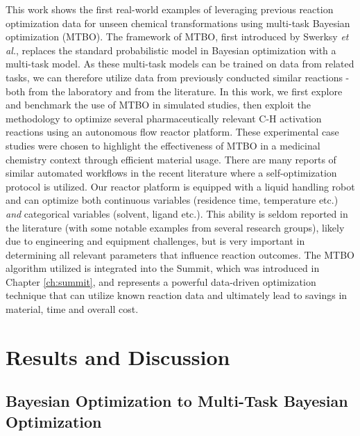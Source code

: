 This work shows the first real-world examples of leveraging previous reaction optimization data for unseen chemical transformations using multi-task Bayesian optimization (MTBO). The framework of MTBO, first introduced by Swerksy \textit{et al.},\cite{Swersky2013} replaces the standard probabilistic model in Bayesian optimization with a multi-task model. As these multi-task models can be trained on data from related tasks, we can therefore utilize data from previously conducted similar reactions - both from the laboratory and from the literature. In this work, we first explore and benchmark the use of MTBO in simulated studies, then exploit the methodology to optimize several pharmaceutically relevant C-H activation reactions using an autonomous flow reactor platform. These experimental case studies were chosen to highlight the effectiveness of MTBO in a medicinal chemistry context through efficient material usage. There are many reports of similar automated workflows in the recent literature where a self-optimization protocol is utilized.\cite{Sans2015, Mateos2019} Our reactor platform is equipped with a liquid handling robot and can optimize both continuous variables (residence time, temperature etc.) \textit{and} categorical variables (solvent, ligand etc.). This ability is seldom reported in the literature (with some notable examples from several research groups),\cite{Reizman2016a, Kershaw2023} likely due to engineering and equipment challenges, but is very important in determining all relevant parameters that influence reaction outcomes. The MTBO algorithm utilized is integrated into the Summit, which was introduced in Chapter \ref{ch:summit}, and represents a powerful data-driven optimization technique that can utilize known reaction data and ultimately lead to savings in material, time and overall cost.



\section{Results and Discussion}

\subsection{Bayesian Optimization to Multi-Task Bayesian Optimization}

